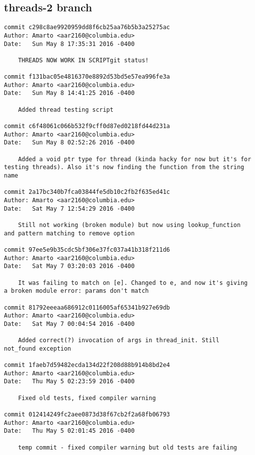 \subsection{threads-2 branch}

    \begin{lstlisting}[backgroundcolor=\color{white}]
commit c298c8ae9920959dd8f6cb25aa76b5b3a25275ac
Author: Amarto <aar2160@columbia.edu>
Date:   Sun May 8 17:35:31 2016 -0400

    THREADS NOW WORK IN SCRIPTgit status!

commit f131bac05e4816370e8892d53bd5e57ea996fe3a
Author: Amarto <aar2160@columbia.edu>
Date:   Sun May 8 14:41:25 2016 -0400

    Added thread testing script

commit c6f48061c066b532f9cff0d87ed0218fd44d231a
Author: Amarto <aar2160@columbia.edu>
Date:   Sun May 8 02:52:26 2016 -0400

    Added a void ptr type for thread (kinda hacky for now but it's for testing threads). Also it's now finding the function from the string name

commit 2a17bc340b7fca03844fe5db10c2fb2f635ed41c
Author: Amarto <aar2160@columbia.edu>
Date:   Sat May 7 12:54:29 2016 -0400

    Still not working (broken module) but now using lookup_function and pattern matching to remove option

commit 97ee5e9b35cdc5bf306e37fc037a41b318f211d6
Author: Amarto <aar2160@columbia.edu>
Date:   Sat May 7 03:20:03 2016 -0400

    It was failing to match on [e]. Changed to e, and now it's giving a broken module error: params don't match

commit 81792eeeaa686912c0116005af65341b927e69db
Author: Amarto <aar2160@columbia.edu>
Date:   Sat May 7 00:04:54 2016 -0400

    Added correct(?) invocation of args in thread_init. Still not_found exception

commit 1faeb7d59482ecda134d22f208d88b914b8bd2e4
Author: Amarto <aar2160@columbia.edu>
Date:   Thu May 5 02:23:59 2016 -0400

    Fixed old tests, fixed compiler warning

commit 012414249fc2aee0873d38f67cb2f2a68fb06793
Author: Amarto <aar2160@columbia.edu>
Date:   Thu May 5 02:01:45 2016 -0400

    temp commit - fixed compiler warning but old tests are failing


\end{lstlisting}
